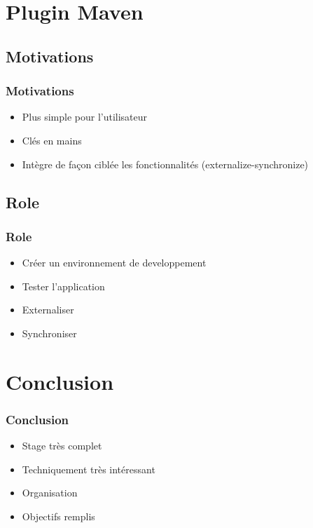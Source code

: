 \documentclass[12pt,a4paper,utf8x]{beamer}
\begin{document}
\section{Plugin Maven}
\subsection*{Motivations}
\begin{frame}\frametitle{Motivations}
\begin{itemize}
\item Plus simple pour l'utilisateur
\item Clés en mains
\item Intègre de façon ciblée les fonctionnalités (externalize-synchronize)
\end{itemize}
\end{frame}	

\subsection*{Role}
\begin{frame}\frametitle{Role}
\begin{itemize}
\item Créer un environnement de developpement
\item Tester l'application
\item Externaliser
\item Synchroniser
\end{itemize}

\end{frame}	

\section{Conclusion}
\begin{frame}\frametitle{Conclusion}
\begin{itemize}
\item Stage très complet
\item Techniquement très intéressant
\item Organisation
\item Objectifs remplis
\end{itemize}


\end{frame}	
\end{document}
